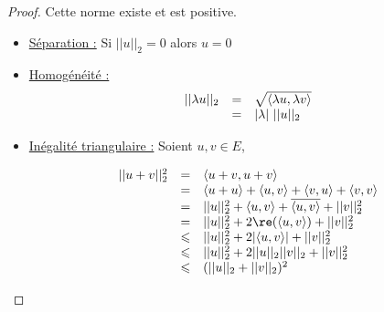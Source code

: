 \begin{proof}
    Cette norme existe et est positive. 

    \begin{itemize}
        \item \uline{Séparation :} Si $||u||_2 = 0$ alors $u=0$

        \item \uline{Homogénéité :}
        \[
            \begin{array}{rcl}
                || \lambda u ||_2 & = & \sqrt{\langle\lambda u, \lambda v \rangle} \\
                \space & = & |\lambda| ~ ||u||_2
            \end{array}
        \]

        \item \uline{Inégalité triangulaire :} Soient $u, v \in E$,

        $$
        \begin{array}{rcl}
            ||u + v||^2_2 & = & \langle u + v, u + v \rangle  \\
            \space & = & \langle u + u \rangle + \langle u, v \rangle + \langle v, u \rangle + \langle v, v \rangle \\
            \space & = & ||u||_2^2 + \langle u, v \rangle + \overline{\langle u, v \rangle} + ||v||_2^2  \\
            \space & =& ||u||_2^2 + 2 \re(\langle u, v \rangle) + ||v||_2^2 \\
            \space & \leqslant & ||u||_2^2 + 2 |\langle u, v \rangle| + ||v||_2^2 \\
            \space & \leqslant & ||u||_2^2 + 2 ||u||_2 ||v||_2 + ||v||_2^2 \\
            \space & \leqslant & (||u||_2 + ||v||_2)^2 \\
        \end{array}
        $$
        
    \end{itemize}

\end{proof}

